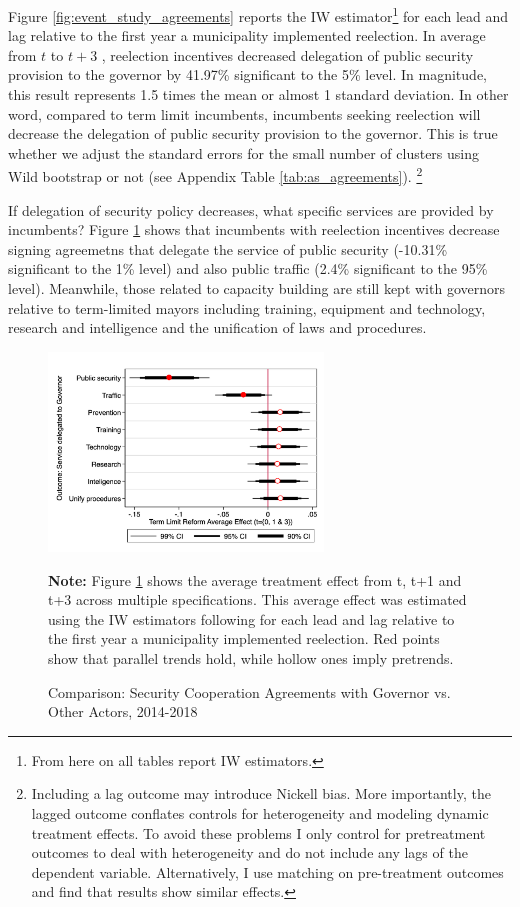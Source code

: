 \documentclass[12pt]{amsart}
\numberwithin{equation}{section}
\theoremstyle{definition}
\theoremstyle{definition}
\theoremstyle{definition}
\begin{document}
Figure \ref{fig:event_study_agreements} reports the IW estimator\footnote{From here on all tables report IW estimators.} for each lead and lag relative to the first year a municipality implemented reelection. In average from $t$ to $t+3$ , reelection incentives decreased delegation of public security provision to the governor by 41.97\% significant to the 5\% level. In magnitude, this result represents 1.5 times the mean or almost 1 standard deviation. In other word, compared to term limit incumbents, incumbents seeking reelection will decrease the delegation of public security provision to the governor. This is true whether we adjust the standard errors for the small number of clusters using Wild bootstrap or not (see Appendix Table \ref{tab:as_agreements}).  \footnote{Including a lag outcome may introduce Nickell bias. More importantly, the lagged outcome conflates controls for heterogeneity and modeling dynamic treatment effects. To avoid these problems I only control for pretreatment outcomes to deal with heterogeneity and do not include  any lags of the dependent variable. Alternatively, I use matching on pre-treatment outcomes and find that results show similar effects.}   
  
 
If delegation of security policy decreases, what specific services are provided by incumbents? Figure \ref{fig:services} shows that incumbents with reelection incentives decrease signing agreemetns that delegate the service of public security (-10.31\% significant to the 1\% level) and also public traffic (2.4\% significant to the 95\% level). Meanwhile, those related to capacity building are still kept with governors relative to term-limited mayors including training, equipment and technology, research and intelligence and the unification of laws and procedures. 


 \begin{figure}[H]   
\centering
 \caption{Comparison: Security Cooperation Agreements with Governor vs. Other Actors, 2014-2018}
 \label{fig:services}
\includegraphics[width=0.65\textwidth]{../Figures/services.png}
       \captionsetup{justification=centering}
       
 \textbf{Note:} Figure \ref{fig:services} shows the average treatment effect from t, t+1 and t+3 across multiple specifications. This average effect was estimated using the IW estimators following \citet{abraham_sun_2020} for each lead and lag relative to the first year a municipality implemented reelection. Red points show that parallel trends hold, while hollow ones imply pretrends. 
\end{figure}  
\end{document}
